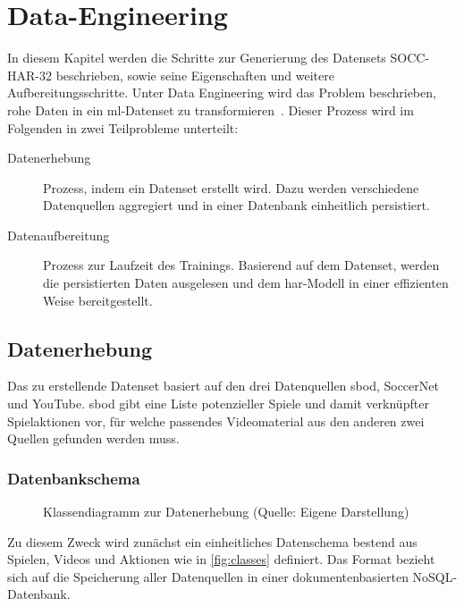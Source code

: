 \chapter{Data-Engineering}
\label{ch:data}

\newcommand{\noaction}{37521\ }
\newcommand{\novideos}{194\ }
\newcommand{\nomatches}{152\ }

In diesem Kapitel werden die Schritte zur Generierung des Datensets SOCC-HAR-32 beschrieben, sowie seine Eigenschaften und weitere Aufbereitungsschritte.
Unter Data Engineering wird das Problem beschrieben, rohe Daten in ein \gls{ml}-Datenset zu transformieren~\cite{Burkov19}.
Dieser Prozess wird im Folgenden in zwei Teilprobleme unterteilt:
\begin{description}
    \item[Datenerhebung] Prozess, indem ein Datenset erstellt wird.
        Dazu werden verschiedene Datenquellen aggregiert und in einer Datenbank einheitlich persistiert.
    \item[Datenaufbereitung] Prozess zur Laufzeit des Trainings.
        Basierend auf dem Datenset, werden die persistierten Daten ausgelesen und dem \gls{har}-Modell in einer effizienten Weise bereitgestellt.
\end{description}

\section{Datenerhebung}
\label{sec:datenerhebung}

Das zu erstellende Datenset basiert auf den drei Datenquellen \gls{sbod}, SoccerNet und YouTube.
\gls{sbod} gibt eine Liste potenzieller Spiele und damit verknüpfter Spielaktionen vor, für welche passendes Videomaterial aus den anderen zwei Quellen gefunden werden muss.

\subsection{Datenbankschema}
\label{subsec:schema}

\begin{figure}
    \centering
    \caption[Klassendiagramm zur Datenerhebung]{Klassendiagramm zur Datenerhebung (Quelle: Eigene Darstellung)}
    \label{fig:classes}
\end{figure}

Zu diesem Zweck wird zunächst ein einheitliches Datenschema bestend aus Spielen, Videos und Aktionen wie in \autoref{fig:classes} definiert.
Das Format bezieht sich auf die Speicherung aller Datenquellen in einer dokumentenbasierten NoSQL-Datenbank.

